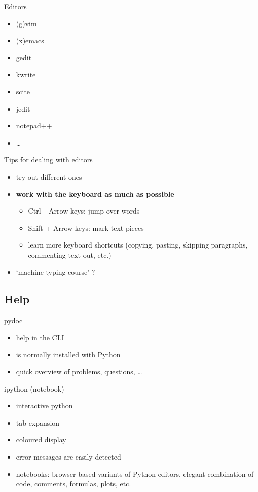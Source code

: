 \documentclass[notes=hide]{beamer}
\begin{document}
\begin{frame}{Editors}
  \begin{itemize}
    \item (g)vim
    \item (x)emacs
    \item gedit
    \item kwrite
    \item scite
    \item jedit
    \item notepad++
    \item \ldots
  \end{itemize}
\end{frame}

\begin{frame}{Tips for dealing with editors}
  \begin{itemize}
    \item try out different ones
    \item \textbf{work with the keyboard as much as possible}
    \begin{itemize}
	    \item Ctrl +Arrow keys: jump over words
	    \item Shift + Arrow keys: mark text pieces
	    \item learn more keyboard shortcuts (copying, pasting, skipping paragraphs, commenting text out, etc.)
    \end{itemize}
    \item `machine typing course' ?
	
  \end{itemize}
\end{frame}


\subsection{Help}

\begin{frame}{pydoc}
  \begin{itemize}
    \item help in the CLI
    \item is normally installed with Python
    \item quick overview of problems, questions, \ldots
  \end{itemize}
\end{frame}

\begin{frame}{ipython (notebook)}
  \begin{itemize}
    \item interactive python
    \item tab expansion
    \item coloured display
    \item error messages are easily detected
    \item notebooks: browser-based variants of Python editors, elegant combination of code, comments, formulas, plots, etc.
  \end{itemize}
\end{frame}
\end{document}
